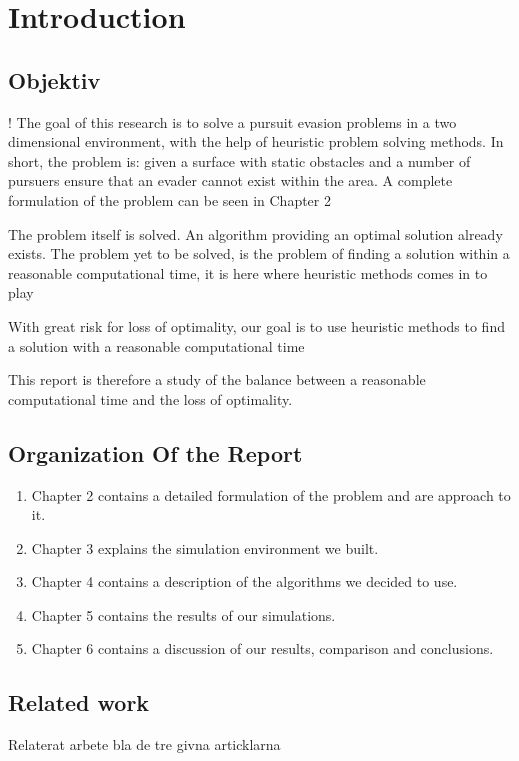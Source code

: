 \chapter{Introduction}

\section{Objektiv}
!
The goal of this research is to solve a pursuit evasion problems in a two dimensional environment, with the help of heuristic problem solving methods.
In short, the problem is: given a surface with static obstacles and a number of pursuers ensure that an evader cannot exist within the area. A complete formulation of the problem can be seen in Chapter 2

The problem itself is solved. An algorithm providing an optimal solution already exists.
The problem yet to be solved, is the problem of finding a solution within a reasonable computational time, it is here where heuristic methods comes in to play

With great risk for loss of optimality, our goal is to use heuristic methods to find a solution with a reasonable computational time
 
This report is therefore a study of the balance between a reasonable computational time and the loss of optimality.

\section{Organization Of the Report}
\begin{enumerate}
\item Chapter 2 contains a detailed formulation of the problem and are approach to it.
\item Chapter 3 explains the simulation environment we built.
\item Chapter 4 contains a description of the algorithms we decided to use.
\item Chapter 5 contains the results of our simulations.
\item Chapter 6 contains a discussion of our results, comparison and conclusions.
\end{enumerate}

\section{ Related work}

Relaterat arbete bla de tre givna articklarna 

